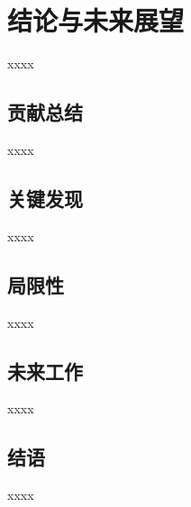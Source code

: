 
\section{结论与未来展望}
\label{sec:conclusion}

xxxx

\subsection{贡献总结}

xxxx

\subsection{关键发现}

xxxx

\subsection{局限性}

xxxx

\subsection{未来工作}

xxxx

\subsection{结语}

xxxx